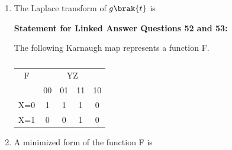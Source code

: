 \documentclass[12pt]{article}
\theoremstyle{remark}
\begin{document}
\begin{enumerate}
\item The Laplace transform of $g\brak{t}$ is
\begin{enumerate}
\end{enumerate}
\hfill{}

\newpage
\begin{flushleft}
\textbf{Statement for Linked Answer Questions 52 and 53:}
\end{flushleft}
The following Karnaugh map represents a function F.
\begin{table}[H]
    \centering
    \begin{tabular}{l|c|c|c|c|}
      \multicolumn{1}{c}{F} & \multicolumn{4}{c}{YZ} \\
      \cline{2-5}
      & 00 & 01 & 11 & 10 \\
      \hline
      \multicolumn{1}{|l|}{X=0} & 1 & 1 & 1 & 0 \\
      \hline
      \multicolumn{1}{|l|}{X=1} & 0 & 0 & 1 & 0 \\
      \hline
    \end{tabular}
    \caption{}
    \label{table:1.1}
\end{table}

\item A minimized form of the function F is
\begin{enumerate}
\end{enumerate}
\hfill{}


\end{enumerate}
\end{document}
